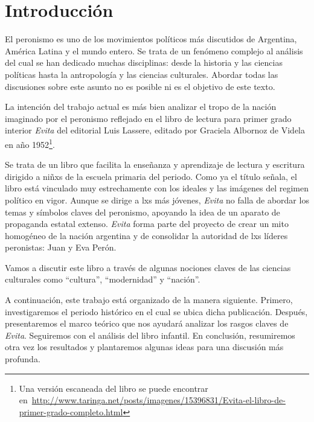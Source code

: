 \documentclass[
10pt, %
a4paper, %
oneside, %
headinclude,footinclude, %
]{scrartcl}
\begin{document}

\section{Introducción}
El peronismo es uno de los movimientos políticos más discutidos de Argentina, América Latina y el mundo entero.
Se trata de un fenómeno complejo al análisis del cual se han dedicado muchas disciplinas: desde la historia y las ciencias políticas hasta la antropología y las ciencias culturales.
Abordar todas las discusiones sobre este asunto no es posible ni es el objetivo de este texto.

La intención del trabajo actual es más bien analizar el tropo de la nación imaginado por el peronismo reflejado en el libro de lectura para primer grado interior \textit{Evita} del editorial Luis Lassere, editado por Graciela Albornoz de Videla en año 1952\footnote{Una versión escaneada del libro se puede encontrar en~\url{http://www.taringa.net/posts/imagenes/15396831/Evita-el-libro-de-primer-grado-completo.html}}.

Se trata de un libro que facilita la enseñanza y aprendizaje de lectura y escritura dirigido a niñxs de la escuela primaria del periodo.
Como ya el título señala, el libro está vinculado muy estrechamente con los ideales y las imágenes del regimen político en vigor.
Aunque se dirige a lxs más jóvenes, \textit{Evita} no falla de abordar los temas y símbolos claves del peronismo, apoyando la idea de un aparato de propaganda estatal extenso.
\textit{Evita} forma parte del proyecto de crear un mito homogéneo de la nación argentina
y de consolidar la autoridad de lxs líderes peronistas: Juan y Eva Perón.

Vamos a discutir este libro a través de algunas nociones claves de las ciencias culturales como ``cultura'', ``modernidad'' y ``nación''.

A continuación, este trabajo está organizado de la manera siguiente.
Primero, investigaremos el periodo histórico en el cual se ubica dicha publicación.
Después, presentaremos el marco teórico que nos ayudará analizar los rasgos claves de \textit{Evita}.
Seguiremos con el análisis del libro infantil.
En conclusión, resumiremos otra vez los resultados y plantaremos algunas ideas para una discusión más profunda.
\end{document}
